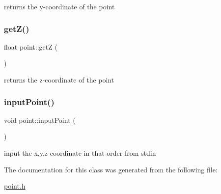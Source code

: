 returns the y-\/coordinate of the point \mbox{\label{classpoint_a18aa4ec7b86492b7c2af4d92a0d09a57}} 
\subsubsection{\texorpdfstring{get\+Z()}{getZ()}}
{\footnotesize\ttfamily float point\+::getZ (\begin{DoxyParamCaption}{ }\end{DoxyParamCaption})}

returns the z-\/coordinate of the point \mbox{\label{classpoint_a91fdb8a1d1dded9dba1a3dc648d94c84}} 
\subsubsection{\texorpdfstring{input\+Point()}{inputPoint()}}
{\footnotesize\ttfamily void point\+::input\+Point (\begin{DoxyParamCaption}{ }\end{DoxyParamCaption})}

input the x,y,z coordinate in that order from stdin 

The documentation for this class was generated from the following file\+:\begin{DoxyCompactItemize}
\item 
\mbox{\hyperlink{point_8h}{point.\+h}}\end{DoxyCompactItemize}

